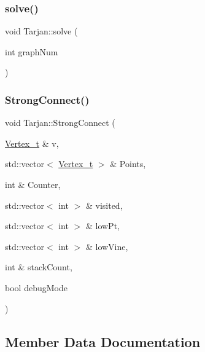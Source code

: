 \mbox{\label{class_tarjan_af94d48b6e78c292bd1aa465d37d89769_af94d48b6e78c292bd1aa465d37d89769}} 
\subsubsection{\texorpdfstring{solve()}{solve()}}
{\footnotesize\ttfamily void Tarjan\+::solve (\begin{DoxyParamCaption}\item[{int}]{graph\+Num }\end{DoxyParamCaption})}

\mbox{\label{class_tarjan_ac76fd1419a2de2dbf34c6ff1d4cc55e2_ac76fd1419a2de2dbf34c6ff1d4cc55e2}} 
\subsubsection{\texorpdfstring{Strong\+Connect()}{StrongConnect()}}
{\footnotesize\ttfamily void Tarjan\+::\+Strong\+Connect (\begin{DoxyParamCaption}\item[{\hyperlink{class_graph_component_ae67114a6ce5a001dc35e1996e1b45aa0_ae67114a6ce5a001dc35e1996e1b45aa0}{Vertex\+\_\+t} \&}]{v,  }\item[{std\+::vector$<$ \hyperlink{class_graph_component_ae67114a6ce5a001dc35e1996e1b45aa0_ae67114a6ce5a001dc35e1996e1b45aa0}{Vertex\+\_\+t} $>$ \&}]{Points,  }\item[{int \&}]{Counter,  }\item[{std\+::vector$<$ int $>$ \&}]{visited,  }\item[{std\+::vector$<$ int $>$ \&}]{low\+Pt,  }\item[{std\+::vector$<$ int $>$ \&}]{low\+Vine,  }\item[{int \&}]{stack\+Count,  }\item[{bool}]{debug\+Mode }\end{DoxyParamCaption})}



\subsection{Member Data Documentation}
\mbox{\label{class_tarjan_aaa327f105a07f07648dcc6f62a565986_aaa327f105a07f07648dcc6f62a565986}} 
